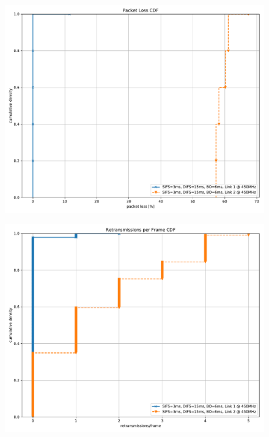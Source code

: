 \documentclass{article}
\begin{document}
\begin{figure}
	\includegraphics[width=\textwidth]{rb_dual/link_1_2/cdf/packet_loss_cdf}
\end{figure}

\begin{figure}
	\includegraphics[width=\textwidth]{rb_dual/link_1_2/cdf/retransmissions_per_frame_cdf}
\end{figure}
\end{document}

